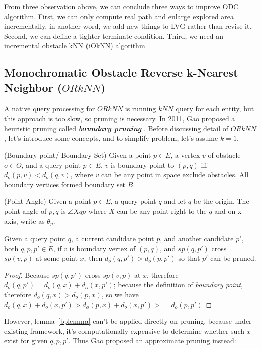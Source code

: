 From three observation above, we can conclude three ways to improve ODC algorithm. First, we
can only compute real path and enlarge explored area incrementally, in another word, we 
add new things to LVG rather than revise it. Second, we can define a tighter terminate
condition. Third, we need an incremental obstacle kNN (iOkNN) algorithm.

\subsection {Monochromatic Obstacle Reverse k-Nearest Neighbor ($\mathit{ORkNN}$)} \label{RNN}

A native query processing for $\mathit{ORkNN}$ is running $kNN$ query for each entity, but this approach is
too slow, so pruning is necessary.
In 2011, Gao proposed a heuristic pruning called \textbf{\textit{boundary pruning}}
\cite{gao2011efficient}. Before discussing detail of $\mathit{ORkNN}$, let's introduce some
concepts, and to simplify problem, let's assume $k=1$.
\begin{definition}{(Boundary point/ Boundary Set)}
  Given a point $p \in E$, a vertex $v$ of obstacle $o \in O$, and a query point $p \in E$,
  $v$ is boundary point to $(p, q)$ iff $d_o(p, v) < d_o(q, v)$, where $v$ can be any point in
  space exclude obstacles.
  All boundary vertices formed boundary set $B$.
\end{definition}

\begin{definition}{(Point Angle)}
  Given a point $p \in E$, a query point $q$ and let $q$ be the origin. The point angle of
  $p,q$ is $\angle Xqp$ where $X$ can be any point right to the $q$ and on x-axis, write as
  $\theta_{p}$.
\end{definition}

\begin{lemma}
Given a query point $q$,
a current candidate point $p$, and another candidate $p'$, both $q,p,p' \in E$,
if $v$ is boundary vertex of $(p,q)$, and $sp(q, p')$ cross $sp(v, p)$ at some point $x$,
then $d_o(q, p') > d_o(p, p')$ so that $p'$ can be pruned.
\label{bplemma}
\end{lemma}
\begin{proof}
Because $sp(q, p')$ cross $sp(v, p)$ at $x$,
therefore $d_o(q, p') = d_o(q, x) + d_o(x, p')$;
because the definition of \textit{boundary point},
therefore $d_o(q, x) > d_o(p, x)$,
so we have $d_o(q, x) + d_o(x, p') > d_o(p, x) + d_o(x, p') >= d_o(p, p')$
\end{proof}
However, lemma~\ref{bplemma} can't be applied directly on pruning,
because under existing framework, it's computationally expensive to determine whether such $x$ exist
for given $q, p, p'$. Thus Gao proposed an approximate pruning instead:

